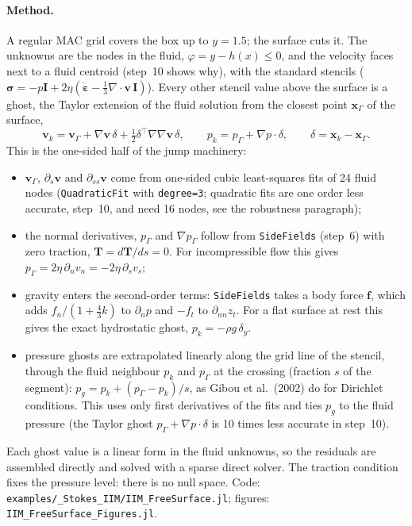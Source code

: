 \documentclass[11pt,a4paper]{article}
\newcommand{\code}[1]{\texttt{#1}}
\begin{document}
\paragraph{Method.} A regular MAC grid covers the box up to $y=1.5$; the surface cuts it. The
unknowns are the nodes in the fluid, $\varphi=y-h(x)\le0$, and the velocity faces next to a
fluid centroid (step~10 shows why), with the standard stencils
($\boldsymbol\sigma=-p\mathbf I+2\eta(\dot{\boldsymbol\varepsilon}-\frac13\nabla\cdot\mathbf v\,\mathbf I)$).
Every other stencil value above the surface is a ghost, the Taylor extension of the fluid solution from the closest point $\mathbf x_\Gamma$ of the surface,
\[
\mathbf v_k=\mathbf v_\Gamma+\nabla\mathbf v\,\delta+\tfrac12\delta^\top\nabla\nabla\mathbf v\,\delta,
\qquad p_k=p_\Gamma+\nabla p\cdot\delta,\qquad \delta=\mathbf x_k-\mathbf x_\Gamma.
\]
This is the one-sided half of the jump machinery:
\begin{itemize}
  \item $\mathbf v_\Gamma$, $\partial_s\mathbf v$ and $\partial_{ss}\mathbf v$ come from one-sided
    cubic least-squares fits of 24 fluid nodes (\code{QuadraticFit} with \code{degree=3}; quadratic
    fits are one order less accurate, step~10, and need 16 nodes, see the robustness paragraph);
  \item the normal derivatives, $p_\Gamma$ and $\nabla p_\Gamma$ follow from \code{SideFields}
    (step~6) with zero traction, $\mathbf T=d\mathbf T/ds=0$. For incompressible flow this gives
    $p_\Gamma=2\eta\,\partial_n v_n=-2\eta\,\partial_s v_s$;
  \item gravity enters the second-order terms: \code{SideFields} takes a body force $\mathbf f$,
    which adds $f_n/(1+\frac43k)$ to $\partial_n p$ and $-f_t$ to $\partial_{nn}z_t$. For a flat
    surface at rest this gives the exact hydrostatic ghost, $p_k=-\rho g\,\delta_y$.
  \item pressure ghosts are extrapolated linearly along the grid line of the stencil, through
    the fluid neighbour $p_k$ and $p_\Gamma$ at the crossing (fraction $s$ of the segment):
    $p_g=p_k+(p_\Gamma-p_k)/s$, as Gibou et al.\ (2002) do for Dirichlet conditions. This uses
    only first derivatives of the fits and ties $p_g$ to the fluid pressure (the Taylor ghost
    $p_\Gamma+\nabla p\cdot\delta$ is 10 times less accurate in step~10).
\end{itemize}
Each ghost value is a linear form in the fluid unknowns, so the residuals are assembled directly
and solved with a sparse direct solver. The traction condition fixes the pressure level: there
is no null space. Code: \code{examples/\allowbreak \_Stokes\_IIM/\allowbreak IIM\_FreeSurface.jl};
figures: \code{IIM\_FreeSurface\_Figures.jl}.
\end{document}
